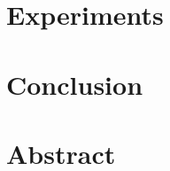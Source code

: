 \documentclass{ferseminar}
\begin{document}
\stvoripredstranice




\section{Experiments}
\section{Conclusion}
\section{Abstract}
\end{document}
